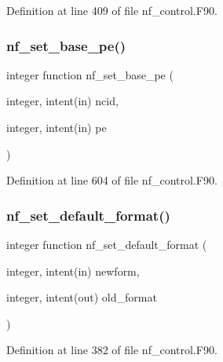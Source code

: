 Definition at line 409 of file nf\+\_\+control.\+F90.

\mbox{\label{nf__control_8F90_a7cb25d69c557c8a6c0ce04c298113d3f}} 
\subsubsection{\texorpdfstring{nf\+\_\+set\+\_\+base\+\_\+pe()}{nf\_set\_base\_pe()}}
{\footnotesize\ttfamily integer function nf\+\_\+set\+\_\+base\+\_\+pe (\begin{DoxyParamCaption}\item[{integer, intent(in)}]{ncid,  }\item[{integer, intent(in)}]{pe }\end{DoxyParamCaption})}



Definition at line 604 of file nf\+\_\+control.\+F90.

\mbox{\label{nf__control_8F90_ac308be58ac892f3a59dd81b7191da990}} 
\subsubsection{\texorpdfstring{nf\+\_\+set\+\_\+default\+\_\+format()}{nf\_set\_default\_format()}}
{\footnotesize\ttfamily integer function nf\+\_\+set\+\_\+default\+\_\+format (\begin{DoxyParamCaption}\item[{integer, intent(in)}]{newform,  }\item[{integer, intent(out)}]{old\+\_\+format }\end{DoxyParamCaption})}



Definition at line 382 of file nf\+\_\+control.\+F90.

\mbox{\label{nf__control_8F90_ae91cc6da7dc6b78f49fb34a03edb6d13}} 
